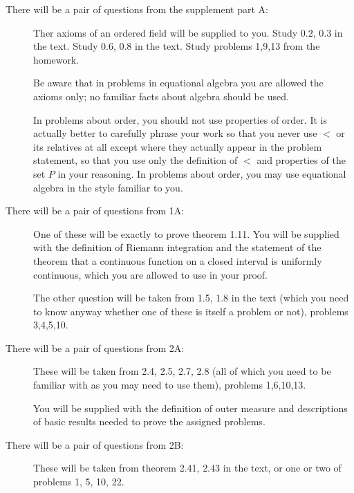 \documentclass[12pt]{article}
\begin{document}
\begin{description}

\item[There will be a pair of questions from the supplement part A:]    Ther axioms of an ordered field will be supplied to you.  Study 0.2, 0.3 in the text.  Study 0.6, 0.8  in the text.  Study problems 1,9,13 from the homework.

Be aware that in problems in equational algebra you are allowed the axioms only;  no familiar facts about algebra should be used.

In problems about order, you should not use properties of order.  It is actually better to carefully phrase your work so that you never use $<$ or its relatives at all except where they actually appear in the problem statement, so that you use only the definition of $<$ and properties of the set $P$ in your reasoning.  In problems about order, you may use equational algebra in the style familiar to you.

\item[There will be a pair of questions from 1A:]  One of these will be exactly to prove theorem 1.11.  You will be supplied with the definition of Riemann integration and the statement of the theorem that a continuous function on a closed interval is uniformly continuous, which you are allowed to use in your proof.

The other question will be taken from 1.5, 1.8  in the text (which you need to know anyway whether one of these is itself a problem or not), problems 3,4,5,10.

\item[There will be a pair of questions from 2A:]  These will be taken from 2.4, 2.5, 2.7, 2.8 (all of which you need to be familiar with as you may need to use them), problems 1,6,10,13.

You will be supplied with the definition of outer measure and descriptions of basic results needed to prove the assigned problems.

\item[There will be a pair of questions from 2B:]   These will be taken from theorem 2.41, 2.43  in the text, or one or two of problems 1, 5, 10, 22.

\end{description}
\end{document}
